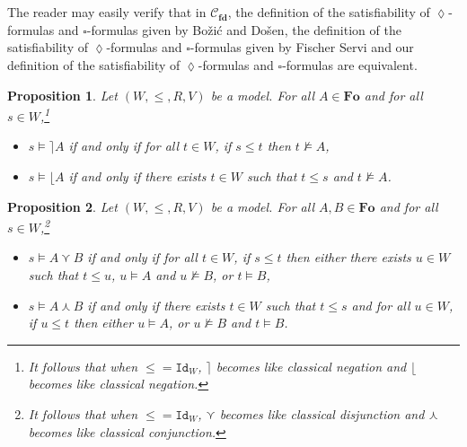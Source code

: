 \documentclass[draft]{article}
\newtheorem{proposition}{Proposition}
\def\Fo{\mathbf{Fo}}
\def\fdcfra{\mathbf{fd}}
\def\Id{\mathtt{Id}}
\begin{document}
%
%
\\
\\
%
%
The reader may easily verify that in ${\mathcal C}_{\fdcfra}$, the definition of the satisfiability of $\lozenge$-formulas and $\square$-formulas given by Bo\v{z}i\'{c} and Do\v{s}en, the definition of the satisfiability of $\lozenge$-formulas and $\square$-formulas given by Fischer Servi and our definition of the satisfiability of $\lozenge$-formulas and $\square$-formulas are equivalent.
%
%
\begin{proposition}\label{Proposition:let:be:a:model:for:all:formulas:and:for:all:if:and:only:if:for:all:if:then:if:and:only:if:there:exists:such:that:and}
%
%
Let $(W,{\leq},{R},V)$ be a model.
For all $A{\in}\Fo$ and for all $s{\in}W$,\footnote{It follows that when ${\leq}{=}{\Id_{W}}$, $\rceil$ becomes like classical negation and $\lfloor$ becomes like classical negation.}
%
%
\begin{itemize}
%
%
\item $s{\models}{\rceil}A$ if and only if for all $t{\in}W$, if $s{\leq}t$ then $t{\not\models}A$,
%
%
%
%
\item $s{\models}{\lfloor}A$ if and only if there exists $t{\in}W$ such that $t{\leq}s$ and $t{\not\models}A$.
%
%
%
%
\end{itemize}
%
%
\end{proposition}
%
%
\begin{proposition}\label{Proposition:about:curlyvee:and:curlywedge:when:we:have:identity:instead:of:preorder}
%
%
Let $(W,{\leq},{R},V)$ be a model.
For all $A,B{\in}\Fo$ and for all $s{\in}W$,\footnote{It follows that when ${\leq}{=}{\Id_{W}}$, $\curlyvee$ becomes like classical disjunction and $\curlywedge$ becomes like classical conjunction.}
%
%
\begin{itemize}
%
%
\item $s{\models}A{\curlyvee}B$ if and only if for all $t{\in}W$, if $s{\leq}t$ then either there exists $u{\in}W$ such that $t{\leq}u$, $u{\models}A$ and $u{\not\models}B$, or $t{\models}B$,
%
%
%
%
\item $s{\models}A{\curlywedge}B$ if and only if there exists $t{\in}W$ such that $t{\leq}s$ and for all $u{\in}W$, if $u{\leq}t$ then either $u{\models}A$, or $u{\not\models}B$ and $t{\models}B$.
%
%
%
%
\end{itemize}
%
%
\end{proposition}
%
%
%
%
\end{document}
